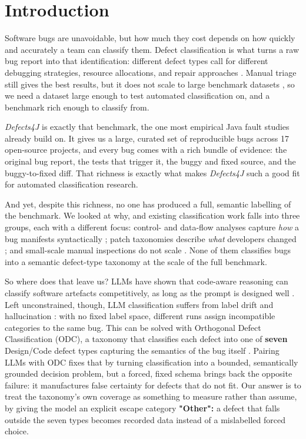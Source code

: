 \section{Introduction}
\label{sec:intro}

Software bugs are unavoidable, but how much they cost depends on how quickly and
accurately a team can classify them. Defect classification is what turns a raw
bug report into that identification: different defect types call for
different debugging strategies, resource allocations, and repair approaches
\citep{catolino2019not,hirsch2022using}. Manual triage still gives the best results, but it does not scale to large
benchmark datasets \citep{andrade2025empirical}, so we need a dataset large
enough to test automated classification on, and a benchmark rich enough to
classify from.

\textit{Defects4J} \citep{just2014defects4j} is exactly that benchmark, the one
most empirical Java fault studies already build on. It gives us a large,
curated set of reproducible bugs across 17 open-source projects, and every bug
comes with a rich bundle of evidence: the original bug report, the tests that
trigger it, the buggy and fixed source, and the buggy-to-fixed diff. That
richness is exactly what makes \textit{Defects4J} such a good fit for automated
classification research.

And yet, despite this richness, no one has produced a full, semantic
labelling of the benchmark. We looked at why, and existing classification work
falls into three groups, each with a different focus: control- and data-flow
analyses capture \emph{how} a bug manifests syntactically
\citep{vanderspuy2025anatomy}; patch taxonomies describe \emph{what} developers
changed \citep{sobreira2018dissection}; and small-scale manual inspections do
not scale \citep{xuan2017better}. None of them classifies bugs into a semantic
defect-type taxonomy at the scale of the full benchmark.

So where does that leave us? LLMs have shown that code-aware reasoning can
classify software artefacts competitively, as long as the prompt is designed
well \citep{colavito2024llm,koyuncu2025exploring,nong2024cot}. Left
unconstrained, though, LLM classification suffers from label drift and
hallucination \citep{gao2024rcegen}: with no fixed label space, different runs
assign incompatible categories to the same bug. This can be solved with
Orthogonal Defect Classification (ODC), a taxonomy that classifies each defect
into one of \textbf{seven} Design/Code defect types capturing the semantics of the bug itself \citep{chillarege1992odc,ibm2013odc}.
Pairing LLMs with ODC fixes that by turning classification into
a bounded, semantically grounded decision problem, but a forced, fixed schema
brings back the opposite failure: it manufactures false certainty for defects
that do not fit. Our answer is to treat the taxonomy's own coverage as
something to measure rather than assume, by giving the model an explicit escape
category \textbf{"Other":} a defect that falls outside the seven types becomes recorded data
instead of a mislabelled forced choice.

